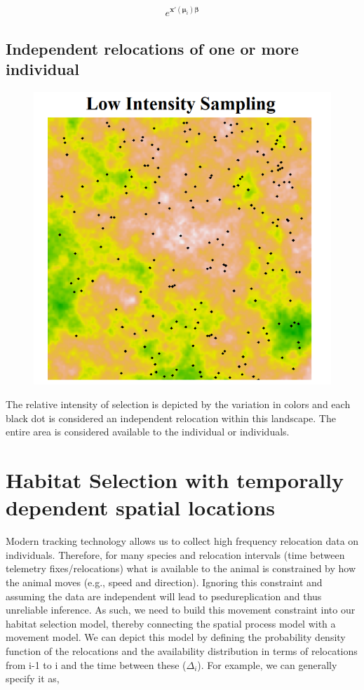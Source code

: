 \documentclass[12pt]{article}
\begin{document}
\Large

\begin{align*}
e^{\textbf{x}'(\boldsymbol{\mu}_{i})\boldsymbol{\beta}}
\end{align*}

\normalsize
\subsection{Independent relocations of one or more individual}


\begin{figure}[h!]
\centering
\includegraphics{sampling1.png}
\end{figure}

The relative intensity of selection is depicted by the variation in colors and each black dot is considered an independent relocation within this landscape. The entire area is considered available to the individual or individuals. 


\section{Habitat Selection with temporally dependent spatial locations}

Modern tracking technology allows us to collect high frequency relocation data on individuals. Therefore, for many species and relocation intervals (time between telemetry fixes/relocations) what is available to the animal is constrained by how the animal moves (e.g., speed and direction). Ignoring this constraint and assuming the data are independent will lead to psedureplication and thus unreliable inference. As such, we need to build this movement constraint into our habitat selection model, thereby connecting the spatial process model with a movement model. We can depict this model by defining the probability density function of the relocations and the availability distribution in terms of relocations from i-1 to i and the time between these ($\Delta_{i}$). For example, we can generally specify it as,
\end{document}
